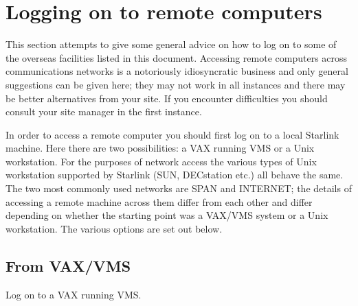 \documentclass[twoside,11pt]{article}
\newcommand{\xlabel}[1]{}
\begin{document}
\section{Logging on to remote computers
\xlabel{logging_on_to_remote_computers}\label{REMOTE}}

This section attempts to give some general advice on how to log on to
some of the overseas facilities listed in this document. Accessing
remote computers across communications networks is a notoriously
idiosyncratic business and only general suggestions can be given here;
they may not work in all instances and there may be better alternatives
from your site. If you encounter difficulties you should consult your
site manager in the first instance.

In order to access a remote computer you should first log on to a local
Starlink machine. Here there are two possibilities: a VAX running VMS
or a Unix workstation. For the purposes of network access the various
types of Unix workstation supported by Starlink (SUN, DECstation etc.)
all behave the same. The two most commonly used networks are SPAN and
INTERNET; the details of accessing a remote machine across them differ
from each other and differ depending on whether the starting point was
a VAX/VMS system or a Unix workstation. The various options are set out
below.

\subsection{From VAX/VMS\xlabel{from_vaxvms}}

Log on to a VAX running VMS.
\end{document}
